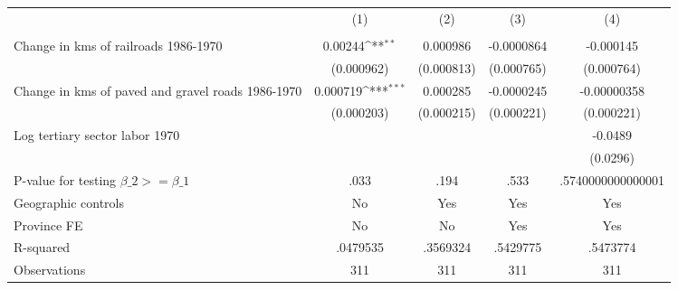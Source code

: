 {
\def\sym#1{\ifmmode^{#1}\else\(^{#1}\)\fi}
\begin{tabular}{l*{4}{c}}
\hline\hline
                &\multicolumn{1}{c}{(1)}&\multicolumn{1}{c}{(2)}&\multicolumn{1}{c}{(3)}&\multicolumn{1}{c}{(4)}\\
                &\multicolumn{1}{c}{}&\multicolumn{1}{c}{}&\multicolumn{1}{c}{}&\multicolumn{1}{c}{}\\
\hline
Change in kms of railroads 1986-1970&  0.00244\sym{**} & 0.000986         &-0.0000864         &-0.000145         \\
                &(0.000962)         &(0.000813)         &(0.000765)         &(0.000764)         \\
[1em]
Change in kms of paved and gravel roads 1986-1970& 0.000719\sym{***}& 0.000285         &-0.0000245         &-0.00000358         \\
                &(0.000203)         &(0.000215)         &(0.000221)         &(0.000221)         \\
[1em]
Log tertiary sector labor 1970&                  &                  &                  &  -0.0489         \\
                &                  &                  &                  & (0.0296)         \\
\hline
P-value for testing $\beta\_{2} >= \beta\_{1}$&     .033         &     .194         &     .533         &.5740000000000001         \\
Geographic controls&       No         &      Yes         &      Yes         &      Yes         \\
Province FE     &       No         &       No         &      Yes         &      Yes         \\
R-squared       & .0479535         & .3569324         & .5429775         & .5473774         \\
Observations    &      311         &      311         &      311         &      311         \\
\hline\hline
\end{tabular}
}
